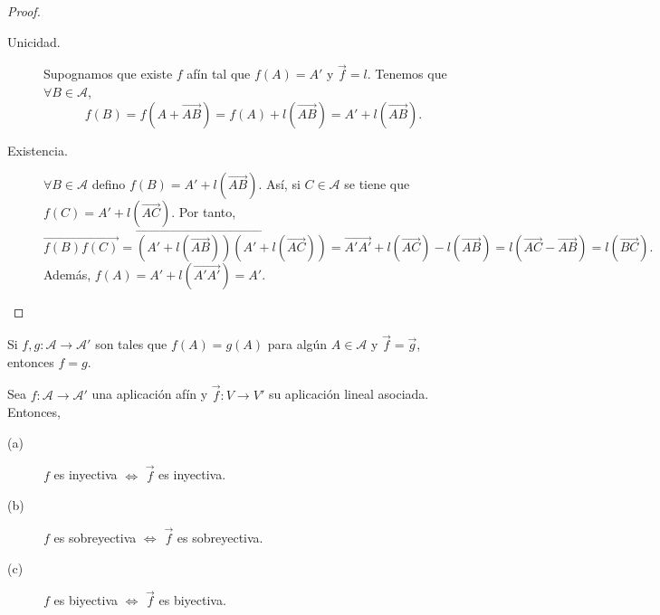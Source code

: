 \begin{proof}
\begin{description}
	\item[Unicidad.] Supognamos que existe $\displaystyle f $ afín tal que $\displaystyle f\left(A\right) = A' $ y $\displaystyle \vec{f} = l $. Tenemos que $\displaystyle \forall B \in \mathcal{A} $,
		\[f\left(B\right) = f\left(A + \overrightarrow{AB}\right) = f\left(A\right) + l\left(\overrightarrow{AB}\right) = A' + l\left(\overrightarrow{AB}\right) .\]
	\item[Existencia.] $\displaystyle \forall B \in \mathcal{A} $ defino $\displaystyle f\left(B\right) = A' + l\left(\overrightarrow{AB}\right) $. Así, si $\displaystyle C \in \mathcal{A} $ se tiene que $\displaystyle f\left(C\right) = A' + l\left(\overrightarrow{AC}\right) $. Por tanto,
	\[ \overrightarrow{f\left(B\right)f\left(C\right)} = \overrightarrow{\left(A'+l\left(\overrightarrow{AB}\right) \right)\left(A'+l\left(\overrightarrow{AC}\right)\right)} = \overrightarrow{A'A'} + l\left(\overrightarrow{AC}\right)-l\left(\overrightarrow{AB}\right) = l\left(\overrightarrow{AC}-\overrightarrow{AB}\right) = l\left(\overrightarrow{BC}\right).\]
	Además, $\displaystyle f\left(A\right)= A' + l\left(\overrightarrow{A'A'}\right) = A' $.
\end{description}
\end{proof}
\begin{fcolorary}[]
\normalfont Si $\displaystyle f,g : \mathcal{A} \to \mathcal{A}' $ son tales que $\displaystyle f\left(A\right)=g\left(A\right) $ para algún $\displaystyle A \in \mathcal{A} $ y $\displaystyle \vec{f} = \vec{g} $, entonces $\displaystyle f = g $.
\end{fcolorary}
\begin{ftheorem}[]
\normalfont Sea $\displaystyle f : \mathcal{A} \to \mathcal{A'} $ una aplicación afín y $\displaystyle \vec{f} : V \to V' $ su aplicación lineal asociada. Entonces,
\begin{description}
\item[(a)] $\displaystyle f $ es inyectiva $\displaystyle \iff  $ $\displaystyle \vec{f} $ es inyectiva.
\item[(b)] $\displaystyle f $ es sobreyectiva $\displaystyle \iff  $ $\displaystyle \vec{f} $ es sobreyectiva.
\item[(c)] $\displaystyle f $ es biyectiva $\displaystyle \iff  $ $\displaystyle \vec{f} $ es biyectiva.
\end{description}
\end{ftheorem}
